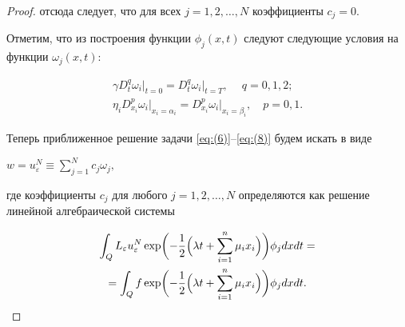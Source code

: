 \begin{proof}
отсюда следует, что  для  всех $j=1, 2, \dots, N$  коэффициенты  $c_j=0$. 



Отметим, что из построения функции  ${{\phi }_{j}}(x,t)$ следуют следующие условия на функции ${{\omega }_{j}}(x,t)$:

\begin{gather}

\label{eq:(14)}

\gamma 

D_{t}^{q} \omega _i \bigr|_{t=0} =

D_{t}^{q} \omega _i \bigr|_{t=T},\quad \ q=0, 1, 2;

\\

\label{eq:(15)}

{{\eta }_{i}}

D_{{{x}_{i}}}^{p} \omega _i \bigr|_{x_i=\alpha _i}=

D_{{{x}_{i}}}^{p} \omega _i \bigr|_{x_i=\beta_i},\quad p=0, 1.

\end{gather}



Теперь приближенное решение задачи \eqref{eq:(6)}--\eqref{eq:(8)} будем искать в виде 

$w=u_{\varepsilon }^{N}\equiv\sum _{j=1}^{N}{{{c}_{j}}}{{\omega }_{j}},$ 

где коэффициенты ${{c}_{j}}$ для любого $j=1, 2, \dots, N$ определяются как решение линейной алгебраической  системы

\begin{multline}

\label{eq:(16)}

\int _{Q}{{{L}_{\varepsilon }}} 

u_{\varepsilon }^{N} 

\exp \biggl(-

\frac{1}{2} \Bigl(\lambda t+\sum\limits_{i=1}^{n}{{{\mu }_{i}}{{x}_{i}}} \Bigr) \biggr)

{{\phi }_{j}}dxdt=  \\

=

\int_{Q} f 

\exp \biggl(-

\frac{1}{2} \Bigl(\lambda t+\sum\limits_{i=1}^{n}{{{\mu }_{i}}{{x}_{i}}} \Bigr) \biggr)

{{\phi }_{j}}dxdt.

\end{multline}




\end{proof}
